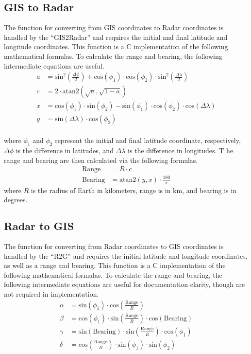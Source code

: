 \documentclass{article}
\begin{document}
\subsection{GIS to Radar}
The function for converting from GIS coordinates to Radar coordinates is handled by the ``GIS2Radar'' 
and requires the initial and final latitude and longitude coordinates. This function is a C implementation 
of the following mathematical formulas. To calculate the range and bearing, the following intermediate 
equations are useful.
\begin{align*}
    a &= \text{sin}^2\left(\frac{\Delta \phi}{2}\right) + 
    \text{cos}(\phi_1) \cdot \text{cos}(\phi_2) \cdot 
    \text{sin}^2\left(\frac{\Delta \lambda}{2}\right) \\
    c &= 2 \cdot \text{atan2}\left(\sqrt{a}, \sqrt{1-a}\right) \\
    x &= \text{cos}(\phi_1) \cdot \text{sin}(\phi_2) - 
    \text{sin}(\phi_1) \cdot \text{cos}(\phi_2) \cdot 
    \text{cos}(\Delta\lambda) \\
    y &= \text{sin}(\Delta\lambda) \cdot \text{cos}(\phi_2) \\
\end{align*}

where $\phi_1$ and $\phi_2$ represent the initial and final latitude coordinate, respectively, 
$\Delta\phi$ is the difference in latitudes, and $\Delta\lambda$ is the difference in longitudes. T
he range and bearing are then calculated via the following formulas.
\begin{align*}
    \text{Range} &= R\cdot c \\
    \text{Bearing} &= \text{atan2}(y,x) \cdot \frac{180}{\pi}
\end{align*}
where $R$ is the radius of Earth in kilometers, range is in km, and bearing is in degrees.


\subsection{Radar to GIS}
The function for converting from Radar coordinates to GIS coordinates is handled by the ``R2G'' and 
requires the initial latitude and longitude coordinates, as well as a range and bearing. This function 
is a C implementation of the following mathematical formulas. To calculate the range and bearing, the 
following intermediate equations are useful for documentation clarity, though are not required in 
implementation.
\begin{align*}
    \alpha &= \text{sin}(\phi_1) 
    \cdot \text{cos}\left(\frac{\text{Range}}{R} \right) \\
    \beta &= \text{cos}(\phi_1) \cdot \text{sin} \left( \frac{\text{Range}}{R} \right) \cdot \text{cos}(
    \text{Bearing}) \\
    \gamma &= \text{sin}(\text{Bearing}) \cdot \text{sin} \left( 
    \frac{\text{Range}}{R} \right) \cdot \text{cos}(\phi_1) \\
    \delta &= \text{cos}\left( 
    \frac{\text{Range}}{R} \right) \cdot \text{sin}(\phi_1) \cdot \text{sin}(\phi_2)
\end{align*}
\end{document}
